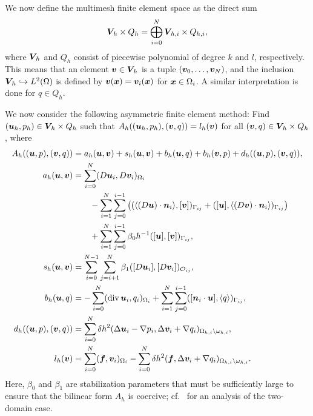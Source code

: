 \documentclass[graybox]{svmult}
\begin{document}
We now define the multimesh finite element space as the direct sum
\begin{align}
  \bm{V\!}_h \times Q_h = \bigoplus_{i=0}^N \bm{V\!}_{h,i}\times Q_{h,i},
\end{align}
where $\bm{V\!}_h$ and $Q_h$ consist of piecewise polynomial of degree $k$ and $l$, respectively. This means that an element $\bm{v} \in \bm{V\!}_h$ is a tuple $(\bm{v}_0, \ldots, \bm{v}_N)$, and the inclusion $\bm{V\!}_h \hookrightarrow L^2(\Omega)$ is defined by $\bm{v}(\bm{x}) = \bm{v}_i(\bm{x})$ for $\bm{x}\in\Omega_i$. A similar interpretation is done for $q \in Q_h$.

We now consider the following asymmetric finite element method: Find $(\bm{u}_h,p_h) \in \bm{V\!}_h \times Q_h$ such that
$A_h((\bm{u}_h, p_h), (\bm{v}, q)) = l_h(\bm{v})$ for all
$(\bm{v},q) \in \bm{V\!}_h \times Q_h$,
where
\begin{align}
  \label{eq:Ah}
  A_h((\bm{u}, p), (\bm{v}, q))
  &=
  a_h(\bm{u},\bm{v}) + s_h(\bm{u}, \bm{v}) +  b_h(\bm{u},q)
  + b_h(\bm{v},p) + d_h((\bm{u},p),(\bm{v},q)),
  \\
  \label{eq:ah}
  a_{h}(\bm{u},\bm{v}) &= \sum_{i=0}^N (D \bm{u}_i, D \bm{v}_i)_{\Omega_i}
  \\ \nonumber
  &\qquad
  - \sum_{i=1}^N \sum_{j=0}^{i-1} \big( (\langle (D \bm{u}) \cdot \bm{n}_i \rangle,[ \bm{v}])_{\Gamma_{ij}}
  + ([ \bm{u}], \langle (D \bm{v}) \cdot \bm{n}_i \rangle)_{\Gamma_{ij}} \big)
  \\ \nonumber
  &\qquad
  +  \sum_{i=1}^N \sum_{j=0}^{i-1} \beta_0 h^{-1}([\bm{u}],[ \bm{v}])_{\Gamma_{ij}},
  \\
  s_{h}(\bm{u},\bm{v})&=
  \sum_{i=0}^{N-1} \sum_{j=i+1}^N  \beta_1 ([D\bm{u}_i], [D\bm{v}_i])_{\mathcal{O}_{ij}},
  \\
  \label{eq:bh}
  b_h(\bm{u},q) &= -  \sum_{i=0}^N (\operatorname*{div} \bm{u}_i,q_i)_{\Omega_i}
  +  \sum_{i=1}^N \sum_{j=0}^{i-1} ([\bm{n}_i \cdot \bm{u}],\langle q \rangle )_{\Gamma_{ij}},
  \\
  \label{eq:dh}
  d_h((\bm{u},p),(\bm{v},q))&=
  \sum_{i=0}^N \delta h^2(\Delta \bm{u}_i - \nabla p_i,\Delta \bm{v}_i + \nabla q_i)_{\Omega_{h,i}\setminus \omega_{h,i}},
  \\
  l_h(\bm{v}) &=  \sum_{i=0}^N (\bm{f},\bm{v}_i)_{\Omega_i}
  -  \sum_{i=0}^N \delta h^2(\bm{f},\Delta \bm{v}_i + \nabla q_i)_{\Omega_{h,i}\setminus \omega_{h,i}}.
\end{align}
Here, $\beta_0$ and $\beta_1$ are stabilization parameters that must be sufficiently large to ensure that the bilinear form $A_h$ is coercive; cf.~\cite{Johansson:2015aa} for an analysis of the two-domain case.
\end{document}
